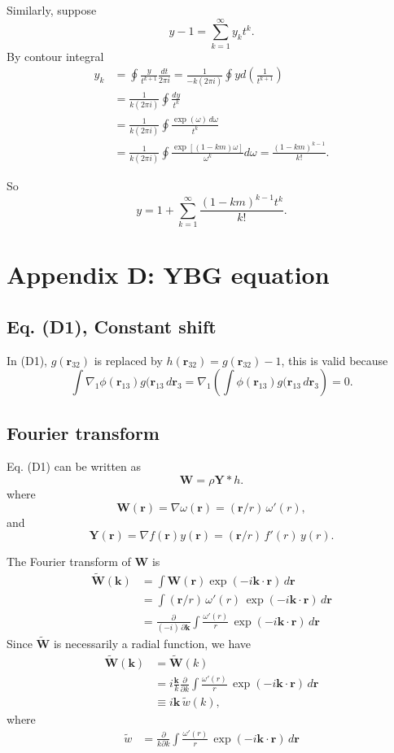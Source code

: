\documentclass[preprint]{revtex4-1}
\numberwithin{equation}{subsection}
\numberwithin{table}{section}
\newcommand{\vct}[1]{\mathbf{#1}}
\providecommand{\vr}{} %
\renewcommand{\vr}{\vct{r}}
\newcommand{\vk}{\vct{k}}
\begin{document}
Similarly, suppose
\[
  y - 1
=
\sum_{k = 1}^\infty y_k t^k.
\]
By contour integral
\begin{align*}
y_k
&=
\oint \frac{y}{t^{k+1}} \frac{dt}{2\pi i}
=
\frac{1}{-k (2\pi i)} \oint y d\left(\frac{1}{t^{k+1}}\right)
\\
&=
\frac{1}{k (2\pi i)} \oint \frac{ dy }{t^{k}}
\\
&=
\frac{1}{k (2\pi i)} \oint \frac{ \exp(\omega) \, d\omega }{t^{k}}
\\
&=
\frac{1}{k (2\pi i)} \oint \frac{ \exp[(1 - k m) \omega]  }{\omega^{k}} d\omega
=
\frac{ (1-k m)^{k-1} }
     { k! }.
\end{align*}

So
\[
  y
=
1 + \sum_{k = 1}^\infty
\frac{ (1 - k m)^{k-1} t^k } { k! }.
\]




\section{Appendix D: YBG equation}

\subsection{Eq. (D1), Constant shift}

In (D1), $g(\vr_{32})$ is replaced by $h(\vr_{32}) = g(\vr_{32}) - 1$,
this is valid because
\[
 \int \nabla_1 \phi(\vr_{13}) g(\vr_{13} \, d\vr_3
= \nabla_1 \left( \int \phi(\vr_{13}) g(\vr_{13} \, d\vr_3 \right)
= 0.
\]


\subsection{Fourier transform}

Eq. (D1) can be written as
\[
  \vct{W}
=
\rho \vct{Y} * h.
\]
where
\[
  \vct{W}(\vr) = \nabla \omega(\vr) = (\vr/r) \, \omega'(r),
\]
and
\[
  \vct{Y}(\vr) = \nabla f(\vr) y(\vr)
  = (\vr/r) \, f'(r) \, y(r).
\]

The Fourier transform of $\vct W$ is
\begin{align*}
  \tilde{\vct{W}}(\vk)
&=
\int \vct{W}(\vr) \exp(-i\vk\cdot\vr) \, d\vr
\\
&=
\int (\vr/r) \, \omega'(r) \, \exp(-i\vk\cdot\vr) \, d\vr
\\
&=
\frac{\partial}{(-i) \, \partial \vk}
\int \frac{\omega'(r)}{r} \, \exp(-i\vk\cdot\vr) \, d\vr
\end{align*}
%
Since $\tilde{\vct{W}}$ is necessarily a radial function,
we have
\begin{align*}
  \tilde{\vct{W}}(\vk)
&=
  \tilde{\vct{W}}(k)
\\
&=
i \frac{\vk}{k} \frac{\partial}{\partial k}
\int \frac{\omega'(r)}{r} \, \exp(-i\vk\cdot\vr) \, d\vr
\\
&\equiv
i \vk \, \tilde{w}(k),
\end{align*}
where
\begin{align*}
\tilde{w}
&=
\frac{\partial}{k\partial k}
\int \frac{\omega'(r)}{r} \, \exp(-i\vk\cdot\vr) \, d\vr
\end{align*}
\end{document}
